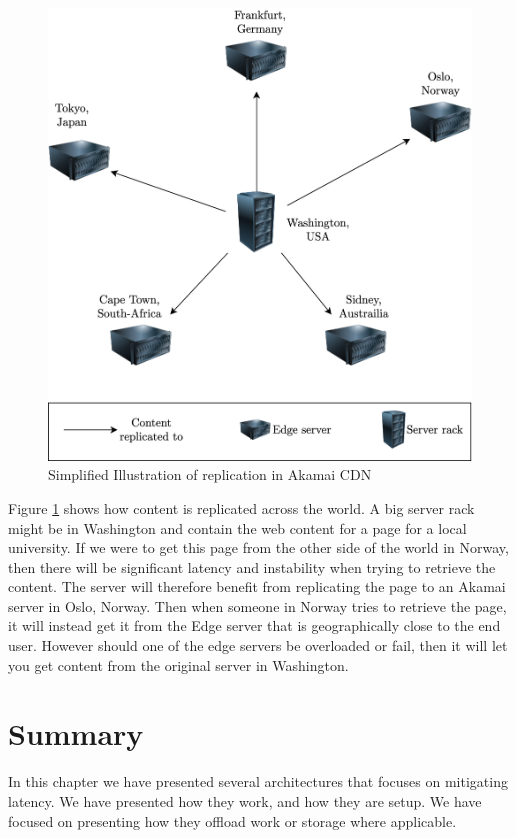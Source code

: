 \begin{figure}[t]
    \centering
    \includegraphics[scale=0.8]{chapters/4_architectures/figures/akamai_dist.png}
    \caption{Simplified Illustration of replication in Akamai CDN}
    \label{fig:Akamai_cdn}
\end{figure}

Figure \ref{fig:Akamai_cdn} shows how content is replicated across the world. A big server rack might be in Washington and contain the web content for a page for a local university. If we were to get this page from the other side of the world in Norway, then there will be significant latency and instability when trying to retrieve the content. The server will therefore benefit from replicating the page to an Akamai server in Oslo, Norway. Then when someone in Norway tries to retrieve the page, it will instead get it from the Edge server that is geographically close to the end user. However should one of the edge servers be overloaded or fail, then it will let you get content from the original server in Washington. 




\section{Summary}
In this chapter we have presented several architectures that focuses on mitigating latency. We have presented how they work, and how they are setup. We have focused on presenting how they offload work or storage where applicable. 